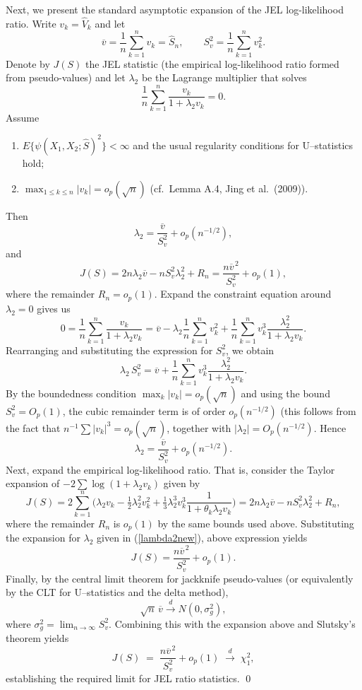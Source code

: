 \documentclass[11pt]{article}
\begin{document}
Next, we present the standard asymptotic expansion of the JEL log-likelihood ratio.
Write $v_k=\widehat V_k$ and let
$$\overline v=\frac{1}{n}\sum_{k=1}^n v_k=\widehat S_n,\qquad
S_v^2=\frac{1}{n}\sum_{k=1}^n v_k^2.$$Denote by \(J(S)\) the JEL statistic (the empirical log-likelihood ratio formed from pseudo-values) and let \(\lambda_2\) be the Lagrange multiplier that solves
$$\frac{1}{n}\sum_{k=1}^n \frac{v_k}{1+\lambda_2 v_k}=0.$$
\noindent Assume
\begin{enumerate}
  \item $E\{\psi(X_1,X_2;\widehat S)^2\}<\infty$ and the usual regularity conditions for U–statistics hold;
  \item $\max_{1\le k\le n}|v_k|=o_p(\sqrt n)$ (cf.\ Lemma A.4, Jing et al.\ (2009)).
\end{enumerate}
Then
$$
\lambda_2=\frac{\overline v}{S_v^2}+o_p(n^{-1/2}),
$$
and
$$
J(S)=2n\lambda_2\overline v-nS_v^2\lambda_2^2+R_n
=\frac{n\overline v^{\,2}}{S_v^2}+o_p(1),
$$
where the remainder $R_n=o_p(1)$.
Expand the constraint equation around $\lambda_2=0$ gives us
$$
0
=\frac{1}{n}\sum_{k=1}^n\frac{v_k}{1+\lambda_2 v_k}
=\overline v - \lambda_2 \frac{1}{n}\sum_{k=1}^n v_k^2
+ \frac{1}{n}\sum_{k=1}^n v_k^3 \frac{\lambda_2^2}{1+\lambda_2 v_k}.
$$
Rearranging and substituting the expression for $S_v^2$, we obtain
$$
\lambda_2 \, S_v^2
= \overline v + \frac{1}{n}\sum_{k=1}^n v_k^3 \frac{\lambda_2^2}{1+\lambda_2 v_k}.
$$
By the boundedness condition $\max_k|v_k|=o_p(\sqrt n)$ and using the bound $S_v^2=O_p(1)$, the cubic remainder term is of order $o_p(n^{-1/2})$ (this follows from the fact that $n^{-1}\sum |v_k|^3 = o_p(\sqrt n)$, together with $|\lambda_2|=O_p(n^{-1/2})$. Hence
\begin{equation}\label{lambda2new}
    \lambda_2 = \frac{\overline v}{S_v^2} + o_p(n^{-1/2}).
\end{equation}
Next, expand the empirical log-likelihood ratio. That is, consider the Taylor expansion of $-2\sum\log(1+\lambda_2 v_k)$ given  by
$$J(S)
=2\sum_{k=1}^n\Big(\lambda_2 v_k - \tfrac{1}{2}\lambda_2^2 v_k^2 + \tfrac{1}{3}\lambda_2^3 v_k^3 \frac{1}{1+\theta_k\lambda_2 v_k}\Big)
=2n\lambda_2 \overline v - n S_v^2\lambda_2^2 + R_n,$$
where the remainder $R_n$ is $o_p(1)$ by the same bounds used above. Substituting the expansion for $\lambda_2$ given in (\ref{lambda2new}), above expression yields
$$J(S)=\frac{n\overline v^{\,2}}{S_v^2}+o_p(1).$$
Finally, by the central limit theorem for jackknife pseudo-values (or equivalently by the CLT for U–statistics and the delta method),
$$
\sqrt n\,\overline v \xrightarrow{d} N(0,\sigma_g^2),
$$
where
$\sigma_g^2=\lim_{n\to\infty}S_v^2$. Combining this with the expansion above and Slutsky's theorem yields
$$
J(S)\;=\;\frac{n\overline v^{\,2}}{S_v^2}+o_p(1)
\;\xrightarrow{d}\;
\chi^2_1,
$$
establishing the required limit for JEL ratio statistics.
\qed\\
\end{document}
